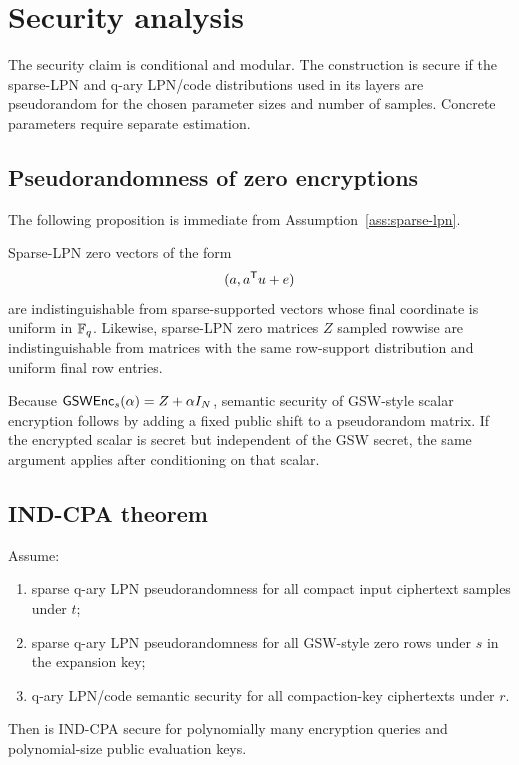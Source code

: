 \section{Security analysis}

The security claim is conditional and modular.  The construction is secure if the sparse-LPN and q-ary LPN/code distributions used in its layers are pseudorandom for the chosen parameter sizes and number of samples.  Concrete parameters require separate estimation.

\subsection{Pseudorandomness of zero encryptions}

The following proposition is immediate from Assumption~\ref{ass:sparse-lpn}.

\begin{proposition}
Sparse-LPN zero vectors of the form
\[
    (a,a^{\mathsf T} u+e)
\]
are indistinguishable from sparse-supported vectors whose final coordinate is uniform in $\mathbb{F}_q$.  Likewise, sparse-LPN zero matrices $Z$ sampled rowwise are indistinguishable from matrices with the same row-support distribution and uniform final row entries.
\end{proposition}

Because $\mathsf{GSW}\mathsf{Enc}_s(\alpha)=Z+\alpha I_N$, semantic security of GSW-style scalar encryption follows by adding a fixed public shift to a pseudorandom matrix.  If the encrypted scalar is secret but independent of the GSW secret, the same argument applies after conditioning on that scalar.

\subsection{IND-CPA theorem}

\begin{theorem}
\label{thm:security}
Assume:
\begin{enumerate}
    \item sparse q-ary LPN pseudorandomness for all compact input ciphertext samples under $t$;
    \item sparse q-ary LPN pseudorandomness for all GSW-style zero rows under $s$ in the expansion key;
    \item q-ary LPN/code semantic security for all compaction-key ciphertexts under $r$.
\end{enumerate}
Then \sable{} is IND-CPA secure for polynomially many encryption queries and polynomial-size public evaluation keys.
\end{theorem}

